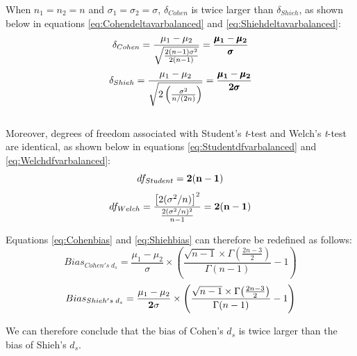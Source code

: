 \documentclass[
  english,
  man,floatsintext]{apa6}
\begin{document}
\begin{appendix}
When \(n_1=n_2=n\) and \(\sigma_1=\sigma_2=\sigma\), \(\delta_{Cohen}\)
is twice larger than \(\delta_{Shieh}\), as shown below in equations
\ref{eq:Cohendeltavarbalanced} and \ref{eq:Shiehdeltavarbalanced}:
\begin{equation} 
\delta_{Cohen}=\frac{\mu_1-\mu_2}{\sqrt{\frac{2(n-1)\sigma^2}{2(n-1)}}}=\bf \frac{\pmb \mu_1- \pmb \mu_2}{\pmb \sigma}
\label{eq:Cohendeltavarbalanced}
\end{equation} \begin{equation} 
\delta_{Shieh}=\frac{\mu_1-\mu_2}{\sqrt{2\left( \frac{\sigma^2}{n/(2n)}\right)}}=\bf \frac{\pmb \mu_1-\pmb\mu_2}{2\pmb\sigma}
\label{eq:Shiehdeltavarbalanced}
\end{equation}\\
Moreover, degrees of freedom associated with Student's \emph{t}-test and
Welch's \emph{t}-test are identical, as shown below in equations
\ref{eq:Studentdfvarbalanced} and \ref{eq:Welchdfvarbalanced}:
\begin{equation} 
df_{Student}=\bf 2(n-1)
\label{eq:Studentdfvarbalanced}
\end{equation} \begin{equation} 
df_{Welch}=\frac{\left[2(\sigma^2/n)\right]^2}{\frac{2(\sigma^2/n)^2}{n-1}}= \bf 2(n-1)
\label{eq:Welchdfvarbalanced}
\end{equation}

Equations \ref{eq:Cohenbias} and \ref{eq:Shiehbias} can therefore be
redefined as follows: \begin{equation} 
Bias_{Cohen's \; d{_s}}=\frac{\mu_1-\mu_2}{\sigma} \times \left( \frac{\sqrt{n-1} \times \Gamma{\left(\frac{2n-3}{2}\right)}}{\Gamma{\left( n-1\right)}} -1 \right)
\label{eq:Cohenbiasvarbalanced}
\end{equation} \begin{equation} 
Bias_{Shieh's \; d{_s}}=\frac{\mu_1-\mu_2}{\bf 2\sigma} \times \left( \frac{\sqrt{n-1} \times \Gamma{\left(\frac{2n-3}{2}\right)}}{\Gamma{\left( n-1\right)}} -1 \right)
\label{eq:Shiehbiasvarbalanced}
\end{equation}

We can therefore conclude that the bias of Cohen's \(d_s\) is twice
larger than the bias of Shieh's \(d_s\).

\newpage

\hypertarget{the-variance-of-cohens-bf-d_s-is-four-times-larger-than-the-bias-of-shiehs-bf-d_s-when-population-variances-and-sample-sizes-are-equal-across-groups-mathematical-demonstration.}{%
}
\end{appendix}
\end{document}
